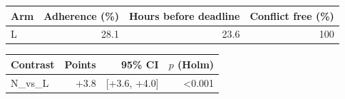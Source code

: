 \begin{tabular}{lrrr}
\hline
Arm & Adherence (\%) & Hours before deadline & Conflict free (\%) \\
\hline
L & 28.1 & 23.6 & 100 \\
\hline
\end{tabular}

\begin{tabular}{lrrr}
\hline
Contrast & Points & 95\% CI & $p$ (Holm) \\
\hline
N_vs_L & +3.8 & [+3.6, +4.0] & <0.001 \\
\hline
\end{tabular}
